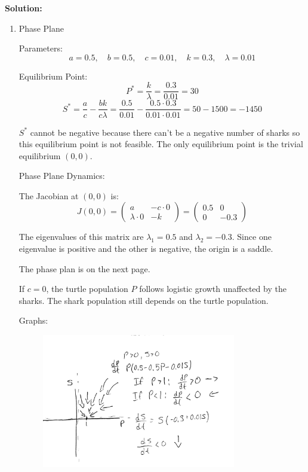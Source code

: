 \documentclass[12pt]{article}
\newenvironment{solution}{
    \textbf{Solution:}
    
}{
    
    \vspace{2em}
}
\begin{document}
\begin{solution}
\begin{enumerate}
        \item Phase Plane
        
        Parameters:
        \[
            a = 0.5, \quad b = 0.5, \quad c = 0.01, \quad k = 0.3, \quad \lambda = 0.01
        \]
        
        Equilibrium Point:
        \[
            P^* = \frac{k}{\lambda} = \frac{0.3}{0.01} = 30
        \]
        \[
            S^* = \frac{a}{c} - \frac{bk}{c\lambda} = \frac{0.5}{0.01} - \frac{0.5 \cdot 0.3}{0.01 \cdot 0.01} = 50 - 1500 = -1450
        \]
        
        \( S^* \) cannot be negative because there can't be a negative number of sharks so this equilibrium point is not feasible. The only equilibrium point is the trivial equilibrium \( (0, 0) \).
        
        Phase Plane Dynamics:
                
        The Jacobian at \( (0, 0) \) is:
        \[
            J(0, 0) = \begin{pmatrix}
                a & -c \cdot 0 \\
                \lambda \cdot 0 & -k
            \end{pmatrix} = \begin{pmatrix}
                0.5 & 0 \\
                0 & -0.3
            \end{pmatrix}
        \]
        
        The eigenvalues of this matrix are \( \lambda_1 = 0.5 \) and \( \lambda_2 = -0.3 \). Since one eigenvalue is positive and the other is negative, the origin is a saddle.
        
        The phase plan is on the next page.
        
        If \( c = 0 \), the turtle population \( P \) follows logistic growth unaffected by the sharks. The shark population still depends on the turtle population.

        Graphs:
        \begin{figure}[H]
            \centering
            \includegraphics[width=0.8\textwidth]{Graph3.pdf}
        \end{figure}
    \end{enumerate}
\end{solution}
\end{document}
